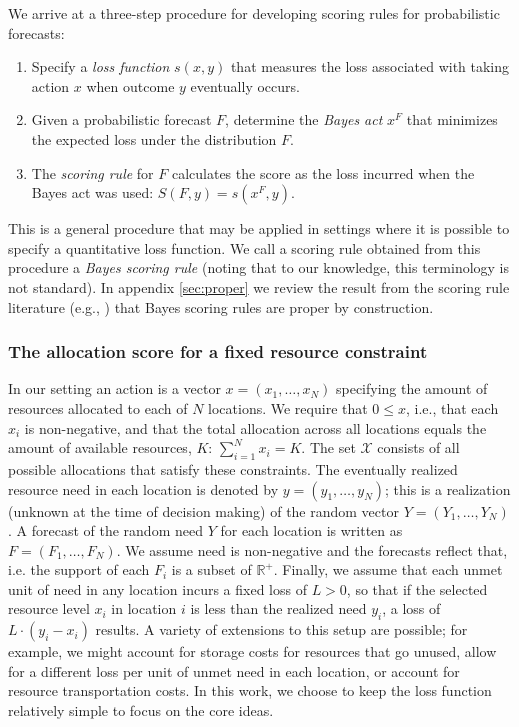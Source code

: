 \documentclass{article}\usepackage[]{graphicx}\usepackage[]{xcolor}
\begin{document}
We arrive at a three-step procedure for developing scoring rules for probabilistic forecasts:
\begin{enumerate}
  \item Specify a \emph{loss function} $s(x, y)$ that measures the loss associated with taking action $x$ when outcome $y$
    eventually occurs.
  \item Given a probabilistic forecast $F$, determine the \emph{Bayes act} $x^F$ that minimizes the expected loss under
    the distribution $F$.
  \item The \emph{scoring rule} for $F$ calculates the score as the loss incurred when the Bayes act was used: 
    $S(F, y) = s(x^F, y)$.
\end{enumerate}
This is a general procedure that may be applied in settings where it is possible to specify a quantitative loss
function. We call a scoring rule obtained from this procedure a \emph{Bayes scoring rule} (noting that to our knowledge, 
this terminology is not standard).  In appendix \ref{sec:proper} we review the
result from the scoring rule literature (e.g., \cite{dawid2007geometry,gneiting2007strictly}) that Bayes scoring
rules are proper by construction.

\subsubsection{The allocation score for a fixed resource constraint}
\label{sec:methods.detailed.specific_allocation}

In our setting an action is a vector $x = (x_1, \ldots, x_N)$ specifying the amount of resources allocated to each of
$N$ locations. We require that $0 \leq x$, i.e., that each $x_i$ is non-negative, and that the total allocation across
all locations equals the amount of available resources, $K$: $\sum_{i=1}^N x_i = K$. The set $\mathcal{X}$ consists of
all possible allocations that satisfy these constraints. The eventually realized resource need in each location is
denoted by $y = (y_1, \ldots, y_N)$; this is a realization (unknown at the
time of decision making) of the random vector $Y = (Y_1, \ldots, Y_N)$. A forecast of the random need $Y$ for each
location is written as $F = (F_1, \ldots, F_N)$. We assume need is non-negative and the forecasts reflect that, i.e. the
support of each $F_i$ is a subset of $\mathbb{R}^+$. Finally, we assume that each unmet unit of need in any location
incurs a fixed loss of $L>0$, so that if the selected resource level $x_i$ in location $i$ is less than the realized
need $y_i$, a loss of $L \cdot (y_i - x_i)$ results. A variety of extensions to this setup are possible; for example, we
might account for storage costs for resources that go unused, allow for a different loss per unit of unmet need in each
location, or account for resource transportation costs. In this work, we choose to keep the loss function relatively
simple to focus on the core ideas.
\end{document}
